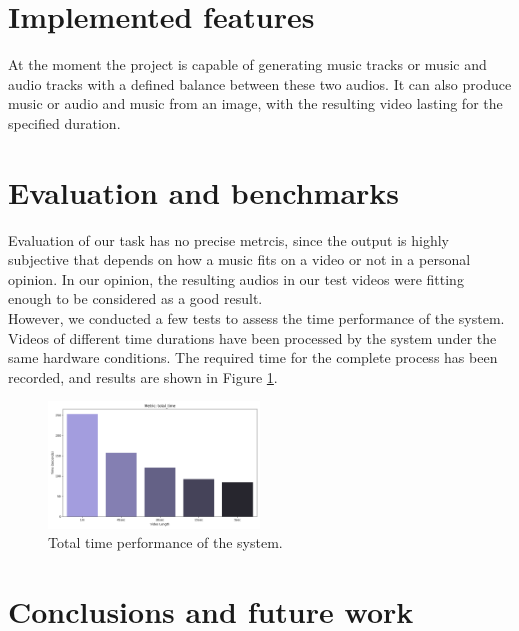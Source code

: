\documentclass[conference]{IEEEtran}
\begin{document}
\section{Implemented features}
At the moment the project is capable of generating music tracks or music and audio tracks with a defined balance between these two audios. It can also produce music or audio and music from an image, with the resulting video lasting for the specified duration. 


\section{Evaluation and benchmarks}
Evaluation of our task has no precise metrcis, since the output is highly subjective that depends on how a music fits on a video or not in a personal opinion.
In our opinion, the resulting audios in our test videos were fitting enough to be considered as a good result.\\
However, we conducted a few tests to assess the time performance of the system. Videos of different time durations have been processed by the system under the same hardware conditions. The required time for the complete process has been recorded, and results are shown in Figure \ref*{time_performance}.

\begin{figure}
    \centerline{\includegraphics[width=0.5\textwidth]{../Presentation/graphs/total_time.png}}
    \caption{Total time performance of the system.}
    \label{time_performance}
\end{figure}

\section{Conclusions and future work}
\end{document}
